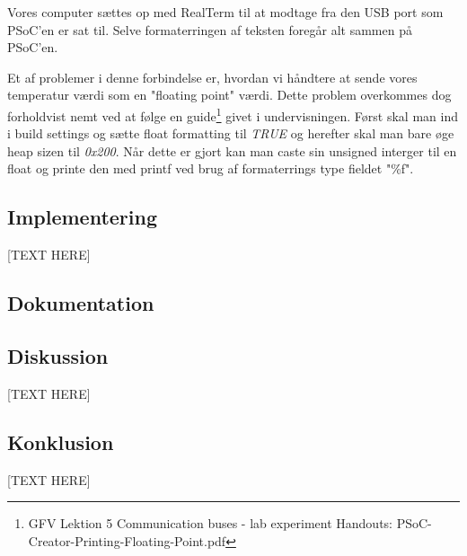 \documentclass[../main.tex]{subfiles}
\begin{document}
Vores computer sættes op med RealTerm til at modtage fra den USB port som PSoC'en er sat til.
Selve formaterringen af teksten foregår alt sammen på PSoC'en.

Et af problemer i denne forbindelse er, hvordan vi håndtere at sende vores temperatur værdi som en "floating point" værdi.
Dette problem overkommes dog forholdvist nemt ved at følge en guide\footnote{GFV Lektion 5 Communication buses - lab experiment Handouts: PSoC-Creator-Printing-Floating-Point.pdf} givet i undervisningen.
Først skal man ind i build settings og sætte float formatting til \textit{TRUE} og herefter skal man bare øge heap sizen til \textit{0x200}.
Når dette er gjort kan man caste sin unsigned interger til en float og printe den med printf ved brug af formaterrings type fieldet "\%f".

\subsection{Implementering}
[TEXT HERE]



\subsection{Dokumentation}





\subsection{Diskussion}
[TEXT HERE]

\subsection{Konklusion}
[TEXT HERE]
\end{document}
